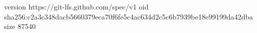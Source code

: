 version https://git-lfs.github.com/spec/v1
oid sha256:c2a3c348dacb5660379eca70f6fe5c4ac634d2c5c6b7939be18e99199da42dba
size 87540
